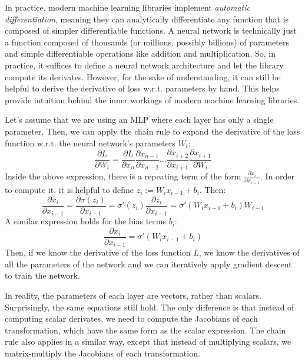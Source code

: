\documentclass[12pt]{article}
\begin{document}
In practice, modern machine learning libraries implement \textit{automatic differentiation}, meaning they can analytically differentiate any function that is composed of simpler differentiable functions. A neural network is technically just a function composed of thousands (or millions, possibly billions) of parameters and simple differentiable operations like addition and multiplication. So, in practice, it suffices to define a neural network architecture and let the library compute its derivates. However, for the sake of understanding, it can still be helpful to derive the derivative of loss w.r.t. parameters by hand. This helps provide intuition behind the inner workings of modern machine learning libraries.

Let's assume that we are using an MLP where each layer has only a single parameter. Then, we can apply the chain rule to expand the derivative of the loss function w.r.t. the neural network's parameters $W_i$:
\begin{equation}
\frac{\partial L}{\partial W_i} = \frac{\partial L}{\partial x_n} \frac{\partial x_{n-1}}{\partial x_{n-2}} \ldots \frac{\partial x_{i+2}}{\partial x_{i+1}} \frac{\partial x_{i+1}}{\partial W_i}
\end{equation}
Inside the above expression, there is a repeating term of the form $\frac{\partial x_{i}}{\partial x_{i-1}}$. In order to compute it, it is helpful to define $z_i := W_i x_{i-1} + b_i$. Then:
\begin{equation}
\frac{\partial x_{i}}{\partial x_{i-1}} = \frac{\partial \sigma(z_{i})}{\partial x_{i-1}} = \sigma'(z_i) \frac{\partial z_{i}}{\partial x_{i-1}} = \sigma'(W_i x_{i-1} + b_i) W_{i-1}
\end{equation}
A similar expression holds for the bias terms $b_i$:
\begin{equation}
\frac{\partial x_{i}}{\partial x_{i-1}} = \sigma'(W_i x_{i-1} + b_i)
\end{equation}
Then, if we know the derivative of the loss function $L$, we know the derivatives of all the parameters of the network and we can iteratively apply gradient descent to train the network.

In reality, the parameters of each layer are vectors, rather than scalars. Surprisingly, the same equations still hold. The only difference is that instead of computing scalar derivates, we need to compute the Jacobians of each transformation, which have the same form as the scalar expression. The chain rule also applies in a similar way, except that instead of multiplying scalars, we matrix-multiply the Jacobians of each transformation.
\end{document}
